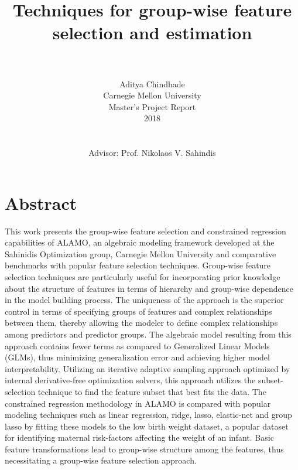 \documentclass[a4paper,12pt]{article}
\title{Techniques for group-wise feature selection and estimation}
\date{}
\author{
\\
\\
Aditya Chindhade
\\ Carnegie Mellon University
\\ Master's Project Report
\\ 2018
\\
\\
\\Advisor: Prof. Nikolaos V. Sahindis 
}
\begin{document}
	\maketitle

	\newpage
	\tableofcontents 
		\newpage
	\listoffigures
	\listoftables

	\newpage
	\section{Abstract}
	This work presents the group-wise feature selection and constrained regression capabilities of ALAMO, an algebraic modeling framework developed at the Sahinidis Optimization group, Carnegie Mellon University and comparative benchmarks with popular feature selection techniques. Group-wise feature selection techniques are particularly useful for incorporating prior knowledge about the structure of features in terms of hierarchy and group-wise dependence in the model building process. The uniqueness of the approach is the superior control in terms of specifying groups of features and complex relationships between them, thereby allowing the modeler to define complex relationships among predictors and predictor groups.	The algebraic model resulting from this approach contains fewer terms as compared to Generalized Linear Models (GLMs), thus minimizing generalization error and achieving higher model interpretability. Utilizing an iterative adaptive sampling approach optimized by internal derivative-free optimization solvers, this approach utilizes the subset-selection technique to find the feature subset that best fits the data. The constrained regression methodology in ALAMO is compared with popular modeling techniques such as linear regression, ridge, lasso, elastic-net and group lasso by fitting these models to the low birth weight dataset, a popular dataset for identifying maternal risk-factors affecting the weight of an infant. Basic feature transformations lead to group-wise structure among the features, thus necessitating a group-wise feature selection approach.
	\newpage
\end{document}

